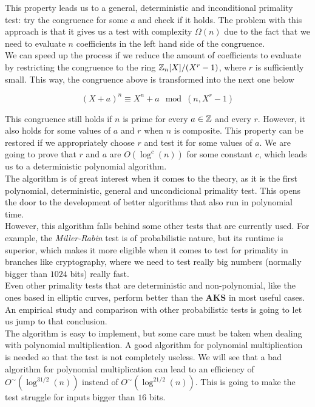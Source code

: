 This property leads us to a general, deterministic and inconditional primality test: try the congruence for some $a$ and check if it holds. The problem with this approach is that it gives us a test with complexity $\Omega(n)$ due to the fact that we need to evaluate $n$ coefficients in the left hand side of the congruence.\\

We can speed up the process if we reduce the amount of coefficients to evaluate by restricting the congruence to the ring $\mathbb{Z}_n[X]/(X^r - 1)$, where $r$ is sufficiently small. This way, the congruence above is transformed into the next one below

\begin{equation}
(X + a)^n \equiv X^n + a \mod(n, X^r - 1)
\end{equation}

This congruence still holds if $n$ is prime for every $a \in \mathbb{Z}$ and every $r$. However, it also holds for some values of $a$ and $r$ when $n$ is composite. This property can be restored if we appropriately choose $r$ and test it for some values of $a$. We are going to prove that $r$ and $a$ are $O(\log^c(n))$ for some constant $c$, which leads us to a deterministic polynomial algorithm.\\

The algorithm is of great interest when it comes to the theory, as it is the first polynomial, deterministic, general and uncondicional primality test. This opens the door to the development of better algorithms that also run in polynomial time.\\

However, this algorithm falls behind some other tests that are currently used. For example, the \textit{Miller-Rabin} test is of probabilistic nature, but its runtime is superior, which makes it more eligible when it comes to test for primality in branches like cryptography, where we need to test really big numbers (normally bigger than $1024$ bits) really fast.\\

Even other primality tests that are deterministic and non-polynomial, like the ones based in elliptic curves, perform better than the \textbf{AKS} in most useful cases.\\

An empirical study and comparison with other probabilistic tests is going to let us jump to that conclusion.\\

The algorithm is easy to implement, but some care must be taken when dealing with polynomial multiplication. A good algorithm for polynomial multiplication is needed so that the test is not completely useless. We will see that a bad algorithm for polynomial multiplication can lead to an efficiency of $O^\sim(\log^{31/2}(n))$ instead of $O^\sim(\log^{21/2}(n))$. This is going to make the test struggle for inputs bigger than $16$ bits.\\

